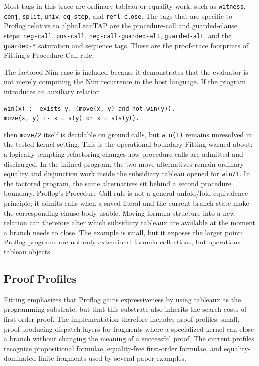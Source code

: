 \documentclass[acmsmall,screen,review,anonymous]{acmart}
\begin{document}
Most tags in this trace are ordinary tableau or equality work, such as
\texttt{witness}, \texttt{conj}, \texttt{split}, \texttt{univ},
\texttt{eq-step}, and \texttt{refl-close}.  The tags that are specific to
Proflog relative to alphaLeanTAP are the procedure-call and guarded-clause
steps: \texttt{neg-call}, \texttt{pos-call},
\texttt{neg-call-guarded-alt}, \texttt{guarded-alt}, and the
\texttt{guarded-*} saturation and sequence tags.  These are the proof-trace
footprints of Fitting's Procedure Call rule.

The factored Nim case is included because it demonstrates that the evaluator is
not merely computing the Nim recurrence in the host language.  If the program
introduces an auxiliary relation

\begin{verbatim}
win(x) :- exists y. (move(x, y) and not win(y)).
move(x, y) :- x = s(y) or x = s(s(y)).
\end{verbatim}

then \texttt{move/2} itself is decidable on ground calls, but \texttt{win(1)}
remains unresolved in the tested kernel setting.  This is the operational
boundary Fitting warned about: a logically tempting refactoring changes how
procedure calls are admitted and discharged.  In the inlined program, the two
move alternatives remain ordinary equality and disjunction work inside the
subsidiary tableau opened for \texttt{win/1}.  In the factored program, the
same alternatives sit behind a second procedure boundary.  Proflog's Procedure
Call rule is not a general unfold/fold equivalence principle; it admits calls
when a saved literal and the current branch state make the corresponding clause
body usable.  Moving formula structure into a new relation can therefore alter
which subsidiary tableaux are available at the moment a branch needs to close.
The example is small, but it exposes the larger point: Proflog programs are not
only extensional formula collections, but operational tableau objects.

\subsection{Proof Profiles}

Fitting emphasizes that Proflog gains expressiveness by using tableaux as the
programming substrate, but that this substrate also inherits the search costs
of first-order proof.  The implementation therefore includes proof profiles:
small, proof-producing dispatch layers for fragments where a specialized
kernel can close a branch without changing the meaning of a successful proof.
The current profiles recognize propositional formulae, equality-free
first-order formulae, and equality-dominated finite fragments used by several
paper examples.
\end{document}
